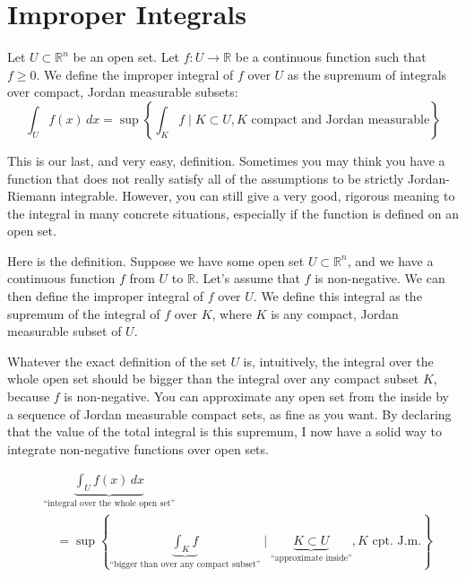 \section{Improper Integrals}

\begin{orange-formula}
\begin{definition}
Let $U \subset \mathbb{R}^n$ be an open set. Let $f: U \to \mathbb{R}$ be a continuous function such that $f \ge 0$.
We define the improper integral of $f$ over $U$ as the supremum of integrals over compact, Jordan measurable subsets:
\[
\int_U f(x) \, dx = \sup \left\{ \int_K f \mid K \subset U, K \text{ compact and Jordan measurable} \right\}
\]
\end{definition}
\end{orange-formula}

\begin{spoken-clean}[00:08:45 - 00:12:07]
This is our last, and very easy, definition. Sometimes you may think you have a function that does not really satisfy all of the assumptions to be strictly Jordan-Riemann integrable. However, you can still give a very good, rigorous meaning to the integral in many concrete situations, especially if the function is defined on an open set.

Here is the definition. Suppose we have some open set $U \subset \mathbb{R}^n$, and we have a continuous function $f$ from $U$ to $\mathbb{R}$. Let's assume that $f$ is non-negative. We can then define the improper integral of $f$ over $U$. We define this integral as the supremum of the integral of $f$ over $K$, where $K$ is any compact, Jordan measurable subset of $U$.

Whatever the exact definition of the set $U$ is, intuitively, the integral over the whole open set should be bigger than the integral over any compact subset $K$, because $f$ is non-negative. You can approximate any open set from the inside by a sequence of Jordan measurable compact sets, as fine as you want. By declaring that the value of the total integral is this supremum, I now have a solid way to integrate non-negative functions over open sets.
\end{spoken-clean}

\begin{math-stroke}
\begin{align*}
&\underbrace{\int_U f(x) \, dx}_{\text{``integral over the whole open set''}} \\
&\quad = \sup \left\{ \underbrace{\int_K f}_{\text{``bigger than over any compact subset''}} \mid \underbrace{K \subset U}_{\text{``approximate inside''}}, K \text{ cpt. J.m.} \right\}
\end{align*}
\end{math-stroke}

